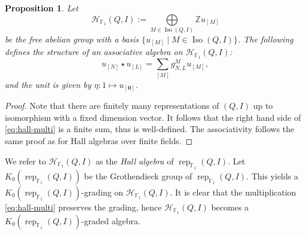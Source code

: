 \documentclass[12pt]{amsart}
\newtheorem{proposition}[theorem]{Proposition}
\theoremstyle{remark}
\theoremstyle{definition}
\numberwithin{equation}{section}
\newcommand{\opname}{\operatorname}
\begin{document}
\begin{proposition}
    Let \[\mathcal{H}_{\mathbb{F}_1}(Q,I):=\bigoplus\limits_{{M}\in\operatorname{Iso}(Q,I) }\mathbb{Z}u_{[{M}]}\] be the free abelian group with a basis $\{u_{[{M}]}\mid {M}\in \opname{Iso}(Q,I)\}$. The following defines the structure of an associative algebra on $\mathcal{H}_{\mathbb{F}_1}(Q,I)$:
 \begin{equation}\label{eq:hall-multi}
u_{[{N}]}\star u_{[{L}]}=\sum_{[{M}]}g_{{N},{L}}^{{M}}u_{[{M}]},
\end{equation}
and the unit is given by $\eta:1\mapsto u_{[\mathbf{0}]}$.
\end{proposition}
\begin{proof}
    Note that there are finitely many representations of $(Q,I)$ up to isomorphism with a fixed dimension vector. It follows that the right hand side of \eqref{eq:hall-multi} is a finite sum, thus is well-defined.  The associativity follows the same proof as for Hall algebras over finite fields.
\end{proof}
We refer to $\mathcal{H}_{\mathbb{F}_1}(Q,I)$ as the {\it Hall algebra} of $\operatorname{rep}_{\mathbb{F}_1}(Q,I)$.
Let $K_0(\operatorname{rep}_{\mathbb{F}_1}(Q,I))$ be the Grothendieck group of $\operatorname{rep}_{\mathbb{F}_1}(Q,I)$. This yields a $K_0(\operatorname{rep}_{\mathbb{F}_1}(Q,I))$-grading on $\mathcal{H}_{\mathbb{F}_1}(Q,I)$. It is clear that the multiplication \eqref{eq:hall-multi} preserves the grading, hence $\mathcal{H}_{\mathbb{F}_1}(Q,I)$ becomes a $K_0(\operatorname{rep}_{\mathbb{F}_1}(Q,I))$-graded algebra.
\end{document}
